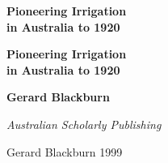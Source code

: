 \documentclass[11pt,b5paper,titlepage]{book}
\newcommand{\clearemptydoublepage}{\newpage{\pagestyle{empty}\cleardoublepage}}
\begin{document}
\frontmatter

\begin{titlepage}
\pagestyle{empty}

\begin{center}

\vspace*{60mm}


{\bfseries\sffamily\Huge Pioneering Irrigation \\[0.5ex]
in Australia to 1920}



\end{center}
\clearemptydoublepage

\begin{center}
\vspace*{30mm}

{\bfseries\sffamily\Huge Pioneering Irrigation \\[0.5ex]
in Australia to 1920}

\vspace{30mm}
{\bfseries\sffamily\huge Gerard Blackburn}

\vspace*{\fill}
{\sffamily\slshape\Large Australian Scholarly Publishing}
\end{center}
\newpage


\begin{raggedright}

\vspace*{15ex}

 Gerard Blackburn 1999


\end{raggedright}
\end{titlepage}
\end{document}
